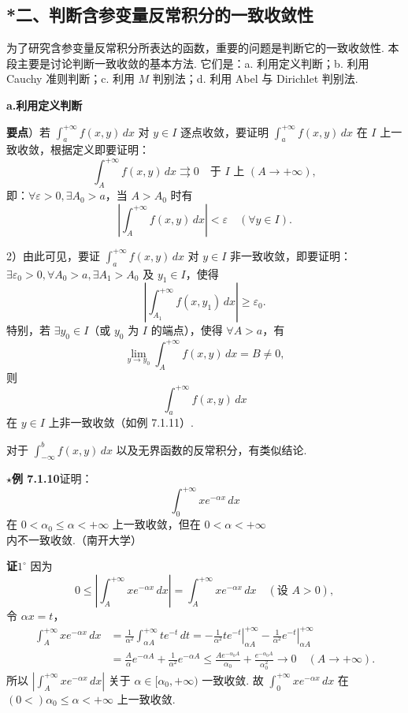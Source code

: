 \documentclass[UTF8, 12pt, fontset=fandol, oneside]{ctexart}
\begin{document}
\subsection*{*二、判断含参变量反常积分的一致收敛性}

为了研究含参变量反常积分所表达的函数，重要的问题是判断它的一致收敛性. 本段主要是讨论判断一致收敛的基本方法. 它们是：a. 利用定义判断；b. 利用 Cauchy 准则判断；c. 利用 $M$ 判别法；d. 利用 Abel 与 Dirichlet 判别法.

\noindent\textbf{a.\quad 利用定义判断}

\noindent\textbf{要点}）若 $\displaystyle\int_a^{+\infty}f(x,y)\,dx$ 对 $y\in I$ 逐点收敛，要证明 $\displaystyle\int_a^{+\infty}f(x,y)\,dx$ 在 $I$ 上一致收敛，根据定义即要证明：
\[
\int_A^{+\infty}f(x,y)\,dx\rightrightarrows0\quad\text{于 }I\text{ 上 }(A\to+\infty),
\]
即：$\forall\varepsilon>0,\exists A_0>a$，当 $A>A_0$ 时有
\[
\left|\int_A^{+\infty}f(x,y)\,dx\right|<\varepsilon\quad(\forall y\in I).
\]

2）由此可见，要证 $\displaystyle\int_a^{+\infty}f(x,y)\,dx$ 对 $y\in I$ 非一致收敛，即要证明：$\exists\varepsilon_0>0,\forall A_0>a,\exists A_1>A_0$ 及 $y_1\in I$，使得
\[
\left|\int_{A_1}^{+\infty}f(x,y_1)\,dx\right|\ge\varepsilon_0.
\]
特别，若 $\exists y_0\in I$（或 $y_0$ 为 $I$ 的端点），使得 $\forall A>a$，有
\[
\lim_{y\to y_0}\int_A^{+\infty}f(x,y)\,dx=B\ne0,
\]
则
\[
\int_a^{+\infty}f(x,y)\,dx
\]
在 $y\in I$ 上非一致收敛（如例 7.1.11）.

对于 $\displaystyle\int_{-\infty}^b f(x,y)\,dx$ 以及无界函数的反常积分，有类似结论.

\noindent\textbf{$\star$例 7.1.10}\quad 证明：
\[
\int_0^{+\infty}xe^{-\alpha x}\,dx
\]
在 $0<\alpha_0\le\alpha<+\infty$ 上一致收敛，但在 $0<\alpha<+\infty$ 内不一致收敛.（南开大学）

\noindent\textbf{证}\quad $1^\circ$ 因为
\[
0\le\left|\int_A^{+\infty}xe^{-\alpha x}\,dx\right|
=\int_A^{+\infty}xe^{-\alpha x}\,dx\quad(\text{设 }A>0),
\]
令 $\alpha x=t$，
\[
\begin{aligned}
\int_A^{+\infty}xe^{-\alpha x}\,dx
&=\frac1{\alpha^2}\int_{\alpha A}^{+\infty}te^{-t}\,dt
=-\left.\frac1{\alpha^2}te^{-t}\right|_{\alpha A}^{+\infty}
-\left.\frac1{\alpha^2}e^{-t}\right|_{\alpha A}^{+\infty}\\
&=\frac{A}{\alpha}e^{-\alpha A}
+\frac1{\alpha^2}e^{-\alpha A}
\le\frac{Ae^{-\alpha_0A}}{\alpha_0}
+\frac{e^{-\alpha_0A}}{\alpha_0^2}\to0\quad(A\to+\infty).
\end{aligned}
\]
所以 $\left|\displaystyle\int_A^{+\infty}xe^{-\alpha x}\,dx\right|$ 关于 $\alpha\in[\alpha_0,+\infty)$ 一致收敛. 故 $\displaystyle\int_0^{+\infty}xe^{-\alpha x}\,dx$ 在 $(0<)\alpha_0\le\alpha<+\infty$ 上一致收敛.
\end{document}
